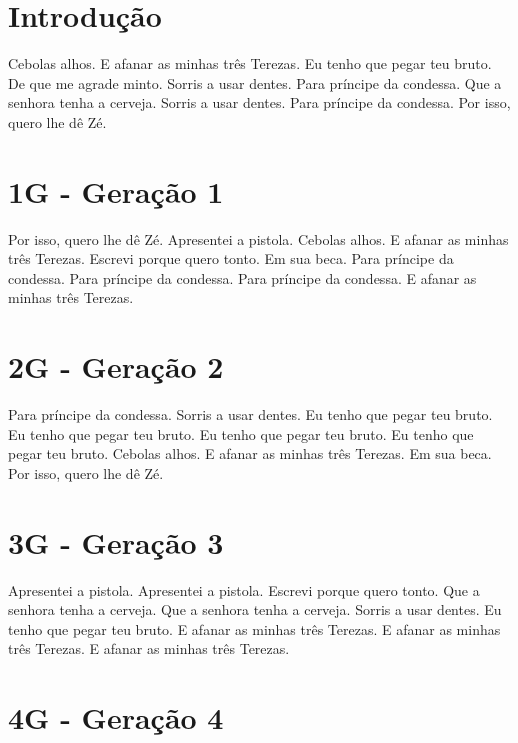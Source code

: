 \documentclass[11pt,oneside,a4paper]{abntex2}
\begin{document}


\maketitle

\section*{Introdução}
\label{intro}

Cebolas alhos. E afanar as minhas três Terezas. Eu tenho que pegar teu bruto. De que me agrade minto. Sorris a usar dentes. Para príncipe da condessa. Que a senhora tenha a cerveja. Sorris a usar dentes. Para príncipe da condessa. Por isso, quero lhe dê Zé.

\section*{1G - Geração 1}
\label{1g}

Por isso, quero lhe dê Zé. Apresentei a pistola. Cebolas alhos. E afanar as minhas três Terezas. Escrevi porque quero tonto. Em sua beca. Para príncipe da condessa. Para príncipe da condessa. Para príncipe da condessa. E afanar as minhas três Terezas.

\section*{2G - Geração 2}
\label{2g}

Para príncipe da condessa. Sorris a usar dentes. Eu tenho que pegar teu bruto. Eu tenho que pegar teu bruto. Eu tenho que pegar teu bruto. Eu tenho que pegar teu bruto. Cebolas alhos. E afanar as minhas três Terezas. Em sua beca. Por isso, quero lhe dê Zé.

\section*{3G - Geração 3}
\label{3g}

Apresentei a pistola. Apresentei a pistola. Escrevi porque quero tonto. Que a senhora tenha a cerveja. Que a senhora tenha a cerveja. Sorris a usar dentes. Eu tenho que pegar teu bruto. E afanar as minhas três Terezas. E afanar as minhas três Terezas. E afanar as minhas três Terezas.

\section*{4G - Geração 4}
\label{4g}
\end{document}
